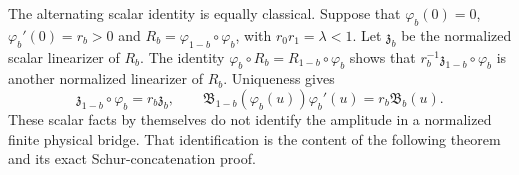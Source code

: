 The alternating scalar identity is equally classical. Suppose that
$\varphi_b(0)=0$, $\varphi_b'(0)=r_b>0$ and
$R_b=\varphi_{1-b}\circ\varphi_b$, with $r_0r_1=\lambda<1$.
Let $\mathfrak z_b$ be the normalized scalar linearizer of $R_b$.
The identity $\varphi_b\circ R_b=R_{1-b}\circ\varphi_b$ shows that
$r_b^{-1}\mathfrak z_{1-b}\circ\varphi_b$ is another normalized
linearizer of $R_b$. Uniqueness gives
\[
 \mathfrak z_{1-b}\circ\varphi_b=r_b\mathfrak z_b,\qquad
 \mathfrak B_{1-b}(\varphi_b(u))\varphi_b'(u)
                                  =r_b\mathfrak B_b(u).
\]
These scalar facts by themselves do not identify the amplitude in a
normalized finite physical bridge. That identification is the content
of the following theorem and its exact Schur-concatenation proof.
